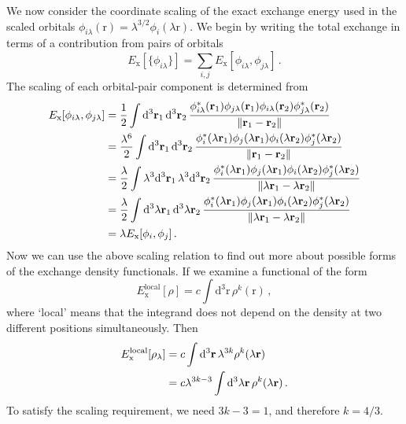 \documentclass{article}
\theoremstyle{plain}\theoremheaderfont{\normalfont\itshape}\theorembodyfont{\rmfamily}\theoremseparator{.}\newtheorem*{rem}{Remark}\newtheorem*{ex}{Example}\newtheorem*{proof}{Proof}\newtheorem*{altp}{Alternative proof}
\theoremstyle{plain}\theoremheaderfont{\normalfont\bfseries}\theorembodyfont{\rmfamily}\theoremseparator{.}\newtheorem{thm}{Theorem}[section]\newtheorem{lem}[thm]{Lemma}\newtheorem{prop}[thm]{Proposition}\newtheorem*{cor}{Corollary}\newtheorem{defn}[thm]{Definition}\newtheorem{clm}[thm]{Claim}\newtheorem{clminproof}{Claim}
\theoremstyle{break}\theoremheaderfont{\normalfont\itshape}\theorembodyfont{\rmfamily}\theoremseparator{.\medskip}\newtheorem*{proofskip}{Proof}\newtheorem*{exs}{Examples}\newtheorem*{rems}{Remarks}
\theoremstyle{break}\theoremheaderfont{\normalfont\bfseries}\theorembodyfont{\rmfamily}\theoremseparator{.\medskip}\newtheorem{lemskip}[thm]{Lemma}\newtheorem{defnskip}[thm]{Definition}\newtheorem{propskip}[thm]{Proposition}\newtheorem{thmskip}[thm]{Theorem}
\numberwithin{equation}{section}
\newcommand{\dd}[2][]{\mathrm{d}^{#1} #2\,}
\newcommand{\vb}[1]{\bm{\mathrm{#1}}}
\newcommand{\norm}[1]{\left\| #1 \right\|}
\newcommand{\x}{_{\text{x}}}
\begin{document}
    We now consider the coordinate scaling of the exact exchange energy used in the scaled orbitals \(\phi_{i\lambda}(\vb{r})=\lambda^{3/2}\phi_{i}(\lambda\vb{r})\). We begin by writing the total exchange in terms of a contribution from pairs of orbitals
    \begin{equation}
        E\x[\{\phi_{i\lambda}\}]=\sum_{i,j}E\x[\phi_{i\lambda},\phi_{j\lambda}]\,.
    \end{equation}
    The scaling of each orbital-pair component is determined from
    \begin{align}
        E\x[\phi_{i\lambda},\phi_{j\lambda}]&=\frac{1}{2}\int\dd[3]{\vb{r}_1}\dd[3]{\vb{r}_2}\frac{\phi_{i\lambda}^*(\vb{r}_1)\phi_{j\lambda}(\vb{r}_1)\phi_{i\lambda}(\vb{r}_2)\phi_{j\lambda}^*(\vb{r}_2)}{\norm{\vb{r}_1-\vb{r}_2}}\notag\\
        &=\frac{\lambda^6}{2}\int\dd[3]{\vb{r}_1}\dd[3]{\vb{r}_2}\frac{\phi_i^*(\lambda\vb{r}_1)\phi_j(\lambda\vb{r}_1)\phi_i(\lambda\vb{r}_2)\phi_j^*(\lambda\vb{r}_2)}{\norm{\vb{r}_1-\vb{r}_2}}\notag\\
        &=\frac{\lambda}{2}\int\lambda^3\dd[3]{\vb{r}_1}\lambda^3\dd[3]{\vb{r}_2}\frac{\phi_i^*(\lambda\vb{r}_1)\phi_j(\lambda\vb{r}_1)\phi_i(\lambda\vb{r}_2)\phi_j^*(\lambda\vb{r}_2)}{\norm{\lambda\vb{r}_1-\lambda\vb{r}_2}}\notag\\
        &=\frac{\lambda}{2}\int\dd[3]{\lambda\vb{r}_1}\dd[3]{\lambda\vb{r}_2}\frac{\phi_i^*(\lambda\vb{r}_1)\phi_j(\lambda\vb{r}_1)\phi_i(\lambda\vb{r}_2)\phi_j^*(\lambda\vb{r}_2)}{\norm{\lambda\vb{r}_1-\lambda\vb{r}_2}}\notag\\
        &=\lambda E\x[\phi_i,\phi_j]\,.
    \end{align}
    Now we can use the above scaling relation to find out more about possible forms of the exchange density functionals. If we examine a functional of the form
    \begin{equation}
        E\x^{\text{local}}[\rho]=c\int\dd[3]{\vb{r}}\rho^k(\vb{r})\,,
    \end{equation}
    where `local' means that the integrand does not depend on the density at two different positions simultaneously. Then
    \begin{align}
        E\x^{\text{local}}[\rho_{\lambda}]&=c\int\dd[3]{\vb{r}}\lambda^{3k}\rho^k(\lambda\vb{r})\notag\\
        &=c\lambda^{3k-3}\int\dd[3]{\lambda\vb{r}}\rho^k(\lambda\vb{r})\,.
    \end{align}
    To satisfy the scaling requirement, we need \(3k-3=1\), and therefore \(k=4/3\).
\end{document}
